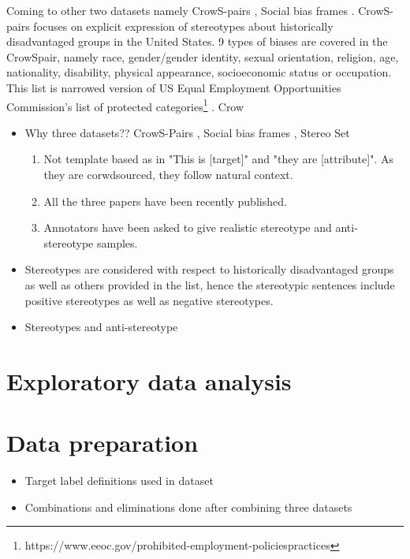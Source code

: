 Coming to other two datasets namely CrowS-pairs \cite{nangia2020crows}, Social bias frames \cite{sap2019social}. CrowS-pairs focuses on explicit expression of stereotypes about historically disadvantaged groups in the United States. 9 types of biases are covered in the CrowSpair, namely race, gender/gender identity, sexual orientation, religion, age, nationality, disability, physical appearance, socioeconomic status or occupation. This list is narrowed version of US Equal Employment Opportunities Commission's list of protected categories\footnote{https://www.eeoc.gov/prohibited-employment-policiespractices} \cite{nangia2020crows}. Crow

\begin{itemize}
    \item Why three datasets?? CrowS-Pairs \cite{nangia2020crows}, Social bias frames \cite{sap2019social}, Stereo Set \cite{nadeem2020stereoset}
    \begin{enumerate}
        \item Not template based as in "This is [target]" and "they are [attribute]". As they are corwdsourced, they follow natural context.
        \item All the three papers have been recently published.
        \item Annotators have been asked to give realistic stereotype and anti-stereotype samples.
    \end{enumerate}
    \item Stereotypes are considered with respect to historically disadvantaged groups as well as others provided in the list, hence the stereotypic sentences include positive stereotypes as well as negative stereotypes.
    \item Stereotypes and anti-stereotype
\end{itemize}
\section{Exploratory data analysis}\label{EDA}
\section{Data preparation}\label{data preparation}
    \begin{itemize}
        \item Target label definitions used in dataset
        \item Combinations and eliminations done after combining three datasets
    \end{itemize}